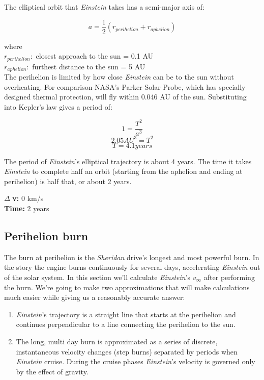 \documentclass[12pt]{article} %
\begin{document}
The elliptical orbit that \textit{Einstein} takes has a semi-major axis of:

$$a = \frac{1}{2}(r_{perihelion} + r_{aphelion})$$

where\\
$r_{perihelion}:$ closest approach to the sun = 0.1 AU\\
$r_{aphelion}:$ furthest distance to the sun = 5 AU\\

The perihelion is limited by how close \textit{Einstein} can be to the sun without overheating. For comparison NASA's Parker Solar Probe, which has specially designed thermal protection, will fly within 0.046 AU of the sun. Substituting into Kepler's law gives a period of:

$$1 = \frac{T^2}{a^3}$$
$$2.05AU^{3} = T^2$$
$$T = 4.1 years$$

The period of \textit{Einstein}'s elliptical trajectory is about 4 years. The time it takes \textit{Einstein} to complete half an orbit (starting from the aphelion and ending at perihelion) is half that, or about 2 years.

$\Delta$ \textbf{v:} 0 km/s\\
\textbf{Time:} 2 years

\subsection{Perihelion burn}
The burn at perihelion is the \textit{Sheridan} drive's longest and most powerful burn. In the story the engine burns continuously for several days, accelerating \textit{Einstein} out of the solar system. In this section we'll calculate \textit{Einstein}'s $v_{\infty}$ after performing the burn. We're going to make two approximations that will make calculations much easier while giving us a reasonably accurate answer:

\begin{enumerate}
\item \textit{Einstein}'s trajectory is a straight line that starts at the perihelion and continues perpendicular to a line connecting the perihelion to the sun.
\item The long, multi day burn is approximated as a series of discrete, instantaneous velocity changes (step burns) separated by periods when \textit{Einstein} cruise. During the cruise phases \textit{Einstein}'s velocity is governed only by the effect of gravity.
\end{enumerate}
\end{document}
